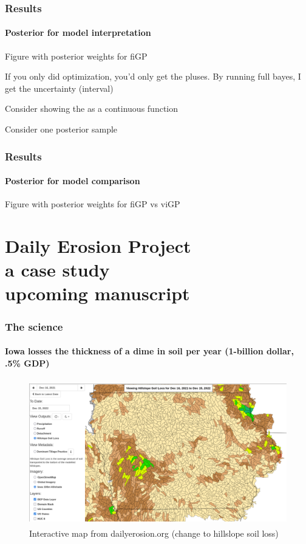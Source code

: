 \documentclass{snedecorbeamer}
\begin{document}
\begin{frame}
  \frametitle{Results}
  \framesubtitle{Posterior for model interpretation}

  Figure with posterior weights for fiGP

  If you only did optimization, you'd only get the pluses. By running full
  bayes, I get the uncertainty (interval)

  Consider showing the as a continuous function

  Consider one posterior sample
\end{frame}

\begin{frame}
  \frametitle{Results}
  \framesubtitle{Posterior for model comparison}

  Figure with posterior weights for fiGP vs viGP
\end{frame}

\section{Daily Erosion Project \\ {\small a case study} \\
  {\tiny upcoming manuscript}}

\begin{frame}
  \frametitle{The science}
  \framesubtitle{Iowa losses the thickness of a dime in soil per year (1-billion
    dollar, .5\% GDP)}

  \begin{figure}
    \centering
    \includegraphics[height=17em]{inc/dep_soilloss_map_20221215_168.png}
      \caption*{%
        \href{https://bit.ly/3HZyaRl}{}
        Interactive map from dailyerosion.org (change to hillslope soil loss)}
  \end{figure}
\end{frame}
\end{document}
